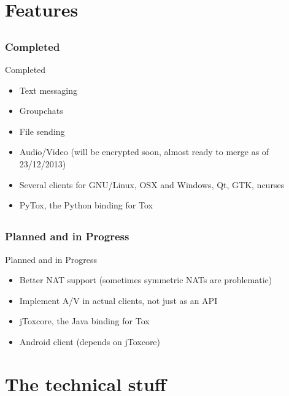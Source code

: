 \documentclass{mybeamer}
\begin{document}
    \section{Features}
    \subsection{}
    \begin{frame}
        \frametitle{Completed}
        \begin{block}{Completed}
            \begin{itemize}
                \item Text messaging
                \item Groupchats
				\item File sending
                \item Audio/Video (will be encrypted soon, almost ready to merge as of 23/12/2013)
                \item Several clients for GNU/Linux, OSX and Windows, Qt, GTK, ncurses
                \item PyTox, the Python binding for Tox
            \end{itemize}
        \end{block}
    \end{frame}
    \subsection{}
    \begin{frame}
        \frametitle{Planned and in Progress}
        \begin{block}{Planned and in Progress}
            \begin{itemize}
                \item Better NAT support (sometimes symmetric NATs are problematic)
                \item Implement A/V in actual clients, not just as an API
                \item jToxcore, the Java binding for Tox
                \item Android client (depends on jToxcore)
            \end{itemize}
        \end{block}
    \end{frame}
    \section{The technical stuff}
    
\end{document}
